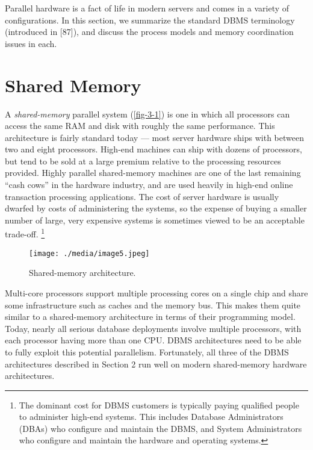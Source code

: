 \documentclass[b5paper,11pt,twoside,openright]{book}
\begin{document}
Parallel hardware is a fact of life in modern servers and comes in a
variety of configurations. In this section, we summarize the standard
DBMS terminology (introduced in {[}87{]}), and discuss the process
models and memory coordination issues in each.

\hypertarget{shared-memory}{%
\section{Shared Memory}\label{shared-memory}}

A \emph{shared-memory} parallel system (\autoref{fig-3-1}) is one in which all
processors can access the same RAM and disk with roughly the same
performance. This architecture is fairly standard today --- most server
hardware ships with between two and eight processors. High-end machines
can ship with dozens of processors, but tend to be sold at a large
premium relative to the processing resources provided. Highly parallel
shared-memory machines are one of the last remaining ``cash cows'' in
the hardware industry, and are used heavily in high-end online
transaction processing applications. The cost of server hardware is
usually dwarfed by costs of administering the systems, so the expense of
buying a smaller number of large, very expensive systems is sometimes
viewed to be an acceptable trade-off.
\footnote{The dominant cost for DBMS customers is typically paying qualified
people to administer high-end systems. This includes Database
Administrators (DBAs) who configure and maintain the DBMS, and System
Administrators who configure and maintain the hardware and operating
systems.}

\begin{figure}
\centering
\texttt{[image: ./media/image5.jpeg]}

\caption{Shared-memory architecture.\label{fig-3-1}}
\end{figure}

Multi-core processors support multiple processing cores on a single
chip and share some infrastructure such as caches and the memory bus.
This makes them quite similar to a shared-memory architecture in terms
of their programming model. Today, nearly all serious database
deployments involve multiple processors, with each processor having more
than one CPU. DBMS architectures need to be able to fully exploit this
potential parallelism. Fortunately, all three of the DBMS architectures
described in Section 2 run well on modern shared-memory hardware
architectures.
\end{document}
